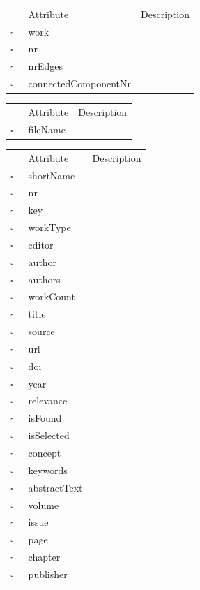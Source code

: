 \begin{table}
\caption{Node  }

\begin{longtable}{llp{8cm}}
& Attribute & Description \\
$\square$\ & work &  \\
$\square$\ & nr &  \\
$\square$\ & nrEdges &  \\
$\square$\ & connectedComponentNr &  \\
\end{longtable}
\label{attr:Node}
\end{table}

\begin{table}
\caption{Orphan  }

\begin{longtable}{llp{8cm}}
& Attribute & Description \\
$\square$\ & fileName &  \\
\end{longtable}
\label{attr:Orphan}
\end{table}

\begin{table}
\caption{OtherWork  }

\begin{longtable}{llp{8cm}}
& Attribute & Description \\
$\square$\ & shortName &  \\
$\square$\ & nr &  \\
$\square$\ & key &  \\
$\square$\ & workType &  \\
$\square$\ & editor &  \\
$\square$\ & author &  \\
$\square$\ & authors &  \\
$\square$\ & workCount &  \\
$\square$\ & title &  \\
$\square$\ & source &  \\
$\square$\ & url &  \\
$\square$\ & doi &  \\
$\square$\ & year &  \\
$\square$\ & relevance &  \\
$\square$\ & isFound &  \\
$\square$\ & isSelected &  \\
$\square$\ & concept &  \\
$\square$\ & keywords &  \\
$\square$\ & abstractText &  \\
$\square$\ & volume &  \\
$\square$\ & issue &  \\
$\square$\ & page &  \\
$\square$\ & chapter &  \\
$\square$\ & publisher &  \\
\end{longtable}
\label{attr:OtherWork}
\end{table}

